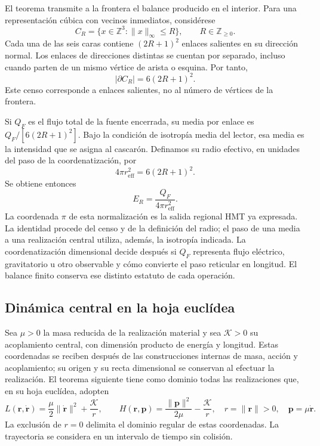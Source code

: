 El teorema transmite a la frontera el balance producido en el
interior. Para una representación cúbica con vecinos inmediatos,
considérese
\[
 C_R=\{x\in\mathbb Z^3:\|x\|_\infty\leq R\},
 \qquad R\in\mathbb Z_{\geq0}.
\]
Cada una de las seis caras contiene $(2R+1)^2$ enlaces
salientes en su dirección normal. Los enlaces de direcciones
distintas se cuentan por separado, incluso cuando parten de
un mismo vértice de arista o esquina. Por tanto,
\begin{equation}
 |\partial C_R|=6(2R+1)^2.
 \label{vi:eq:frontera-cubica}
\end{equation}
Este censo corresponde a enlaces salientes, no al número de
vértices de la frontera.

Si $Q_F$ es el flujo total de la fuente encerrada, su media
por enlace es $Q_F/[6(2R+1)^2]$. Bajo la condición de isotropía
media del lector, esa media es la intensidad que se asigna al
cascarón. Definamos su radio efectivo, en unidades del paso de
la coordenatización, por
\begin{equation}
 4\pi r_{\mathrm{eff}}^2=6(2R+1)^2.
 \label{vi:eq:radio-efectivo}
\end{equation}
Se obtiene entonces
\begin{equation}
 E_R=\frac{Q_F}{4\pi r_{\mathrm{eff}}^2}.
 \label{vi:eq:inverso-area}
\end{equation}
La coordenada $\pi$ de esta normalización es la salida regional
HMT ya expresada. La identidad procede del censo y de la
definición del radio; el paso de una media a una realización
central utiliza, además, la isotropía indicada. La coordenatización
dimensional decide después si $Q_F$ representa flujo eléctrico,
gravitatorio u otro observable y cómo convierte el paso
reticular en longitud. El balance finito conserva ese
distinto estatuto de cada operación.

\subsection{Dinámica central en la hoja euclídea}
\label{vi:subsec:dinamica-central}

Sea $\mu>0$ la masa reducida de la realización material y sea
$\mathcal K>0$ su acoplamiento central, con dimensión
producto de energía y longitud. Estas coordenadas se reciben después
de las construcciones internas de masa, acción y acoplamiento;
su origen y su recta dimensional se conservan al efectuar la
realización. El teorema siguiente tiene como dominio todas
las realizaciones que, en su hoja euclídea, adopten
\begin{equation}
 L(\mathbf r,\dot{\mathbf r})
 =\frac\mu2\|\dot{\mathbf r}\|^2+\frac{\mathcal K}{r},
 \qquad
 H(\mathbf r,\mathbf p)
 =\frac{\|\mathbf p\|^2}{2\mu}-\frac{\mathcal K}{r},
 \quad r=\|\mathbf r\|>0,
 \quad\mathbf p=\mu\dot{\mathbf r}.
 \label{vi:eq:kepler-lh}
\end{equation}
La exclusión de $r=0$ delimita el dominio regular de estas
coordenadas. La trayectoria se considera en un intervalo de
tiempo sin colisión.

